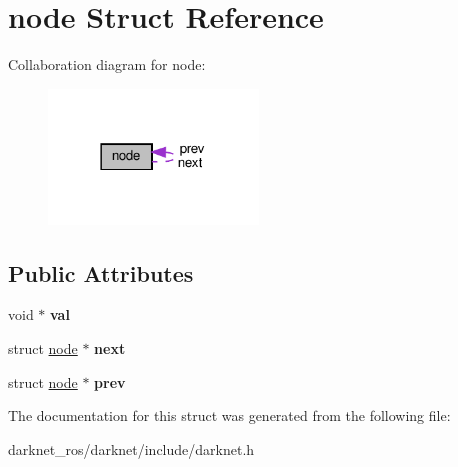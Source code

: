 \hypertarget{structnode}{}\section{node Struct Reference}
\label{structnode}


Collaboration diagram for node\+:\nopagebreak
\begin{figure}[H]
\begin{center}
\leavevmode
\includegraphics[width=158pt]{structnode__coll__graph}
\end{center}
\end{figure}
\subsection*{Public Attributes}
\begin{DoxyCompactItemize}
\item 
\mbox{\label{structnode_a3866f55c05d50265b730d8cdeec0a1f8}} 
void $\ast$ {\bfseries val}
\item 
\mbox{\label{structnode_aa3e8aa83f864292b5a01210f4453fcc0}} 
struct \hyperlink{structnode}{node} $\ast$ {\bfseries next}
\item 
\mbox{\label{structnode_a7ee3d227c728ce18a86e43ebc301046e}} 
struct \hyperlink{structnode}{node} $\ast$ {\bfseries prev}
\end{DoxyCompactItemize}


The documentation for this struct was generated from the following file\+:\begin{DoxyCompactItemize}
\item 
darknet\+\_\+ros/darknet/include/darknet.\+h\end{DoxyCompactItemize}
